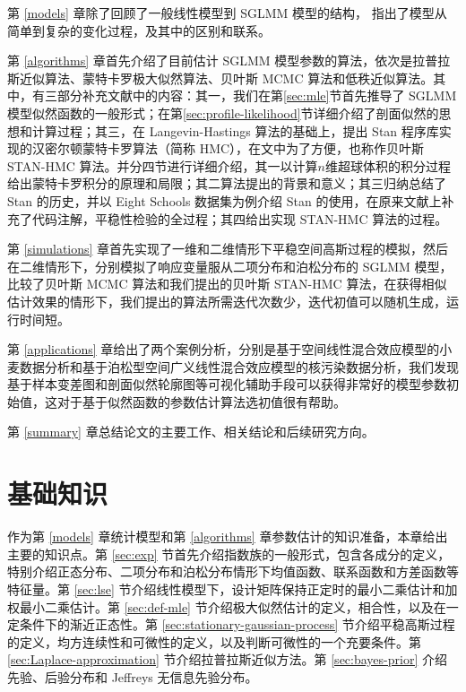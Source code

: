 \documentclass[12pt,a4paper,UTF8,twoside]{book}
\theoremstyle{definition}
\theoremstyle{definition}
\theoremstyle{definition}
\theoremstyle{remark}
\begin{document}
第 \ref{models} 章除了回顾了一般线性模型到 SGLMM 模型的结构，
指出了模型从简单到复杂的变化过程，及其中的区别和联系。

第 \ref{algorithms} 章首先介绍了目前估计 SGLMM
模型参数的算法，依次是拉普拉斯近似算法、蒙特卡罗极大似然算法、贝叶斯
MCMC
算法和低秩近似算法。其中，有三部分补充文献中的内容：其一，我们在第\ref{sec:mle}节首先推导了
SGLMM
模型似然函数的一般形式；在第\ref{sec:profile-likelihood}节详细介绍了剖面似然的思想和计算过程；其三，在
Langevin-Hastings 算法的基础上，提出 Stan
程序库实现的汉密尔顿蒙特卡罗算法（简称
HMC），在文中为了方便，也称作贝叶斯 STAN-HMC
算法。并分四节进行详细介绍，其一以计算\(n\)维超球体积的积分过程给出蒙特卡罗积分的原理和局限；其二算法提出的背景和意义；其三归纳总结了
Stan 的历史，并以 Eight Schools 数据集为例介绍 Stan
的使用，在原来文献上补充了代码注解，平稳性检验的全过程；其四给出实现
STAN-HMC 算法的过程。

第 \ref{simulations}
章首先实现了一维和二维情形下平稳空间高斯过程的模拟，然后在二维情形下，分别模拟了响应变量服从二项分布和泊松分布的
SGLMM 模型，比较了贝叶斯 MCMC 算法和我们提出的贝叶斯 STAN-HMC
算法，在获得相似估计效果的情形下，我们提出的算法所需迭代次数少，迭代初值可以随机生成，运行时间短。

第 \ref{applications}
章给出了两个案例分析，分别是基于空间线性混合效应模型的小麦数据分析和基于泊松型空间广义线性混合效应模型的核污染数据分析，我们发现基于样本变差图和剖面似然轮廓图等可视化辅助手段可以获得非常好的模型参数初始值，这对于基于似然函数的参数估计算法选初值很有帮助。

第 \ref{summary} 章总结论文的主要工作、相关结论和后续研究方向。

\hypertarget{prepare}{%
\chapter{基础知识}\label{prepare}}

作为第 \ref{models} 章统计模型和第 \ref{algorithms}
章参数估计的知识准备，本章给出主要的知识点。第 \ref{sec:exp}
节首先介绍指数族的一般形式，包含各成分的定义，特别介绍正态分布、二项分布和泊松分布情形下均值函数、联系函数和方差函数等特征量。第
\ref{sec:lse}
节介绍线性模型下，设计矩阵保持正定时的最小二乘估计和加权最小二乘估计。第
\ref{sec:def-mle}
节介绍极大似然估计的定义，相合性，以及在一定条件下的渐近正态性。第
\ref{sec:stationary-gaussian-process}
节介绍平稳高斯过程的定义，均方连续性和可微性的定义，以及判断可微性的一个充要条件。第
\ref{sec:Laplace-approximation} 节介绍拉普拉斯近似方法。第
\ref{sec:bayes-prior} 介绍先验、后验分布和 Jeffreys 无信息先验分布。
\end{document}
